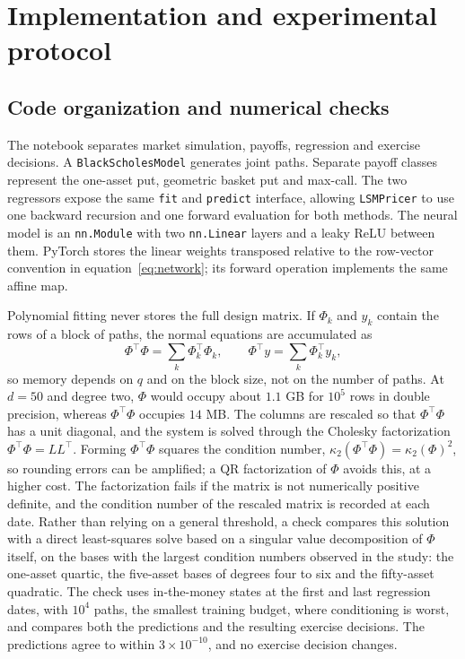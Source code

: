 \documentclass[11pt,a4paper]{article}
\begin{document}
\section{Implementation and experimental protocol}
\subsection{Code organization and numerical checks}
The notebook separates market simulation, payoffs, regression and exercise
decisions. A \texttt{BlackScholesModel} generates joint paths. Separate payoff
classes represent the one-asset put, geometric basket put and max-call.
The two regressors expose the same \texttt{fit} and \texttt{predict} interface,
allowing \texttt{LSMPricer} to use one backward recursion and one forward evaluation
for both methods. The neural model is an \texttt{nn.Module} with two
\texttt{nn.Linear} layers and a leaky ReLU between them. PyTorch stores the
linear weights transposed relative to the row-vector convention in
equation~\eqref{eq:network}; its forward operation implements the same affine map.

Polynomial fitting never stores the full design matrix. If $\Phi_k$ and $y_k$ contain
the rows of a block of paths, the normal equations are accumulated as
\[
 \Phi^\top\Phi=\sum_k\Phi_k^\top\Phi_k,\qquad \Phi^\top y=\sum_k\Phi_k^\top y_k,
\]
so memory depends on $q$ and on the block size, not on the number of paths.
At $d=50$ and degree two, $\Phi$ would occupy about $1.1$ GB for $10^5$ rows in
double precision, whereas $\Phi^\top\Phi$ occupies $14$ MB. The columns are rescaled
so that $\Phi^\top\Phi$ has a unit diagonal, and the system is solved through the
Cholesky factorization $\Phi^\top\Phi=LL^\top$. Forming $\Phi^\top\Phi$ squares the
condition number, $\kappa_2(\Phi^\top\Phi)=\kappa_2(\Phi)^2$, so rounding errors can be
amplified; a QR factorization of $\Phi$ avoids this, at a higher cost. The factorization
fails if the matrix is not numerically positive definite, and the condition number of
the rescaled matrix is recorded at each date. Rather than relying on a general threshold,
a check compares this solution with a direct least-squares solve based on a singular
value decomposition of $\Phi$ itself, on the bases with the largest condition numbers
observed in the study: the one-asset quartic, the five-asset bases of degrees four to six
and the fifty-asset quadratic. The check uses in-the-money states at the first and last
regression dates, with $10^4$ paths, the smallest training budget, where conditioning is
worst, and compares both the predictions and the resulting exercise decisions. The
predictions agree to within $3\times10^{-10}$, and no exercise decision changes.
\end{document}
